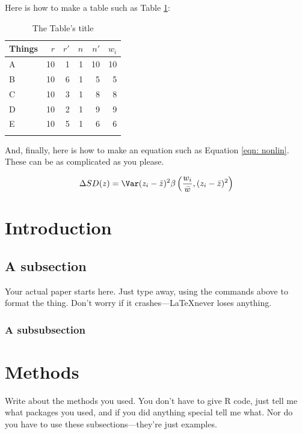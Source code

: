 \documentclass[onecolumn]{article}
\begin{document}
Here is how to make a table such as Table \ref{table:things table}:
\begin{table}[ht]
\begin{center}
\begin{tabular}{lrrrrr}%
\hline
Things&$r$&$r'$&$n$&$n'$&$w_i$\\
\hline
A&10&1&1&10&10 \\
B&10&6&1&5&5\\
C&10&3&1&8&8\\
D&10&2&1&9&9\\
E&10&5&1&6&6\\
\bottomrule
\\
\end{tabular}
\caption{The Table's title}
\label{table:things table}
\end{center}
\end{table}

And, finally, here is how to make an equation such as Equation \ref{eqn: nonlin}. These can be as complicated as you please. 

\begin{equation}
\Delta SD(z)= \Var(z_i-\bar z)^2\beta\left(\frac{w_i}{\bar w}, (z_i-\bar z)^2\right)
\label{eqn: nonlin}
\end{equation}

\newpage
\section{Introduction}


\subsection{A subsection}
Your actual paper starts here. Just type away, using the commands above to format the thing. Don't worry if it crashes---\LaTeX never loses anything.
\subsubsection{A subsubsection}

\section{Methods}

Write about the methods you used.  You don't have to give R code, just tell me what packages you used, and if you did anything special tell me what. Nor do you have to use these subsections---they're just examples. 
\end{document}
